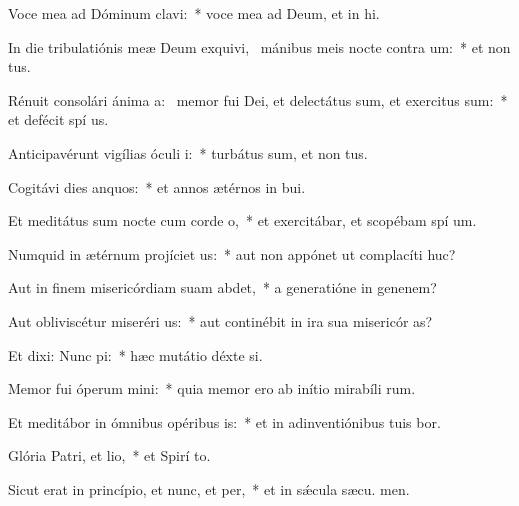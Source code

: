 \item Voce mea ad Dóminum clavi:~* voce mea ad Deum, et in hi.
\item In die tribulatiónis meæ Deum exquivi,~\pscross{} mánibus meis nocte contra um:~* et non  tus.
\item Rénuit consolári ánima a:~\pscross{} memor fui Dei, et delectátus sum, et exercitus sum:~* et defécit spí us.
\item Anticipavérunt vigílias óculi i:~* turbátus sum, et non  tus.
\item Cogitávi dies anquos:~* et annos ætérnos in  bui.
\item Et meditátus sum nocte cum corde o,~* et exercitábar, et scopébam spí um.
\item Numquid in ætérnum projíciet us:~* aut non appónet ut complacíti  huc?
\item Aut in finem misericórdiam suam abdet,~* a generatióne in genenem?
\item Aut obliviscétur miseréri us:~* aut continébit in ira sua misericór as?
\item Et dixi: Nunc pi:~* hæc mutátio déxte si.
\item Memor fui óperum mini:~* quia memor ero ab inítio mirabíli rum.
\item Et meditábor in ómnibus opéribus is:~* et in adinventiónibus tuis bor.
\item Glória Patri, et lio,~* et Spirí to.
\item Sicut erat in princípio, et nunc, et per,~* et in sǽcula sæcu. men.
